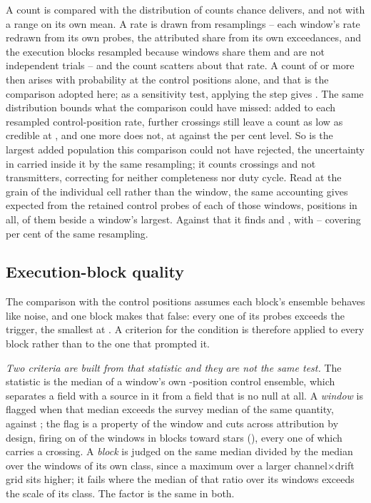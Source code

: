 A count is compared with the distribution of counts chance delivers, and
not with a range on its own mean. A rate is drawn from \CeNBoot{} resamplings
-- each window's rate redrawn from its own \NCtrl{} probes, the attributed
share from its own \CeNExc{} exceedances, and the execution blocks resampled
because windows share them and are not independent trials -- and the count
scatters about that rate. A count of \CeObs{} or more then arises with
probability \CeProbNull{} at the control positions alone, and that is the
comparison adopted here; as a sensitivity test, applying the step gives
\CeProbStep. The same distribution bounds what the comparison could have
missed: added to each resampled control-position rate, \CeAddLim{} further
crossings still leave a count as low as \CeObs{} credible at \CeProbAtLim,
and one more does not, at \CeProbAboveLim{} against the \CeAlphaPct{} per
cent level. So \CeAddLim{} is the largest added population this comparison
could not have rejected, the uncertainty in \CeExp{} carried inside it by the
same resampling; it counts crossings and not transmitters, correcting for
neither completeness nor duty cycle. Read at the grain of
the individual cell rather than the window, the same accounting gives
\CkExp{} expected from the \CkNCtrlPerWin{} retained control probes of each
of those \CkNWin{} windows, \CkNCtrlPos{} positions in all, \CkExpSec{}
of them beside a window's largest. Against that it finds \CkNObs{} and
\CkNSecUnattr, with \CkLo--\CkHi{} covering \CeCovPct{} per cent of the same
resampling.

\subsection{Execution-block quality}
\label{sec:blockquality}

The comparison with the control positions assumes each block's ensemble
behaves like noise, and one block makes that false: every one of its \NCtrl{}
probes exceeds the trigger, the smallest at \BqFailCtrlMin. A criterion for
the condition is therefore applied to every block rather than to the one that
prompted it.

\emph{Two criteria are built from that statistic and they are not the same
test.} The statistic is the median of a window's own \NCtrl-position control
ensemble, which separates a field with a source in it from a field that is no
null at all. A \emph{window} is flagged when that median exceeds \BqFactor{}
the survey median of the same quantity, \DqThresh{} against \DqSurvMed; the
flag is a property of the window and cuts across attribution by design,
firing on \DqNWin{} of the \NWindows{} windows in \BkFlagNBlock{} blocks
toward \DqNStar{} stars (\DqStars), every one of which carries a crossing.
A \emph{block} is judged on the same median divided by the median over the
windows of its own class, since a maximum over a larger channel$\times$drift
grid sits higher; it fails where the median of that ratio over its windows
exceeds \BqFactor{} the scale of its class. The factor is the same in both.

